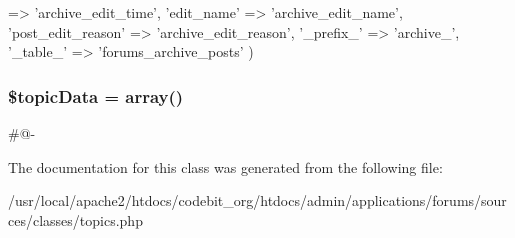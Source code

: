\begin{DoxyCode}
       => \textcolor{stringliteral}{'archive\_edit\_time'},
                                                          \textcolor{stringliteral}{'edit\_name'}           
       => \textcolor{stringliteral}{'archive\_edit\_name'},
                                                          \textcolor{stringliteral}{'post\_edit\_reason'} =>
       \textcolor{stringliteral}{'archive\_edit\_reason'},
                                                          \textcolor{stringliteral}{'\_prefix\_'}            
       => \textcolor{stringliteral}{'archive\_'},
                                                          \textcolor{stringliteral}{'\_table\_'}                     
       => \textcolor{stringliteral}{'forums\_archive\_posts'} )
\end{DoxyCode}
\hypertarget{classapp__forums__classes__topics_a0d3ec74991237d3bab61d7f995f5e3f9}{
\subsubsection[{\$topic\-Data}]{\setlength{\rightskip}{0pt plus 5cm}\$topic\-Data = array()\hspace{0.3cm}{\ttfamily [protected]}}}\label{classapp__forums__classes__topics_a0d3ec74991237d3bab61d7f995f5e3f9}
\#@-\/ 

The documentation for this class was generated from the following file\-:\begin{DoxyCompactItemize}
\item 
/usr/local/apache2/htdocs/codebit\-\_\-org/htdocs/admin/applications/forums/sources/classes/topics.\-php\end{DoxyCompactItemize}
